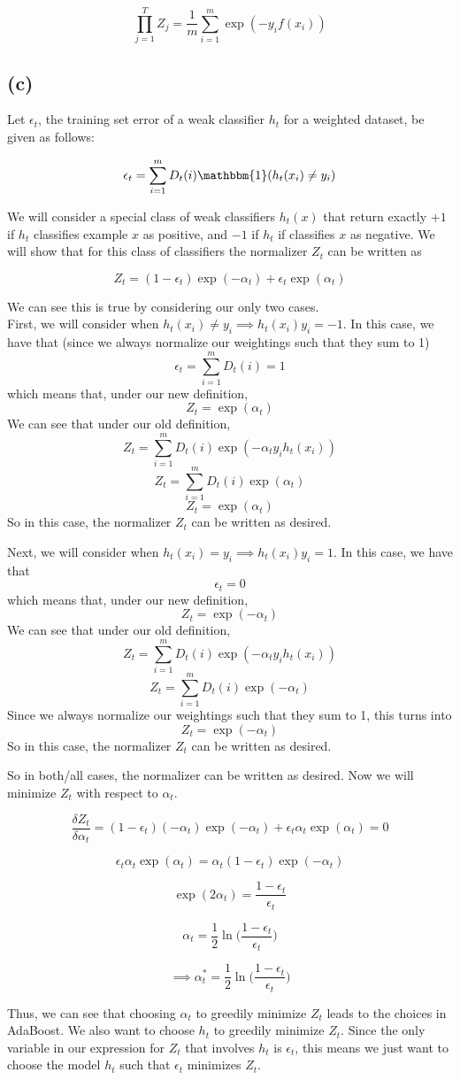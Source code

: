\documentclass{article}
\begin{document}
\[ \prod_{j = 1}^{T} Z_j = \frac{1}{m} \sum_{i = 1}^m \exp(-y_i f(x_i)) \]

\subsection*{(c)}
Let $\epsilon_t$, the training set error of a weak classifier $h_t$ for a weighted
dataset, be given as follows:

\[ \epsilon_t = \sum_{i = 1}^m D_t(i) \mathbbm{1} (h_t(x_i) \neq y_i) \]

We will consider a special class of weak classifiers $h_t(x)$ that return exactly
$+1$ if $h_t$ classifies example $x$ as positive, and $-1$ if $h_t$ if classifies
$x$ as negative. We will show that for this class of classifiers the normalizer
$Z_t$ can be written as

\[ Z_t = (1 - \epsilon_t) \exp(-\alpha_t) + \epsilon_t \exp(\alpha_t) \]

We can see this is true by considering our only two cases. \\
First, we will consider when $h_t(x_i) \neq y_i \implies h_t(x_i) y_i = -1$.
In this case, we have that (since we always normalize our weightings such that
they sum to 1)
\[ \epsilon_t = \sum_{i = 1}^m D_t(i) = 1 \]
which means that, under our new definition,
\[ Z_t = \exp(\alpha_t) \]
We can see that under our old definition,
\[ Z_t = \sum_{i = 1}^m D_t(i) \exp(-\alpha_t y_i h_t(x_i)) \]
\[ Z_t = \sum_{i = 1}^m D_t(i) \exp(\alpha_t) \]
\[ Z_t = \exp(\alpha_t) \]
So in this case, the normalizer $Z_t$ can be written as desired.

Next, we will consider when $h_t(x_i) = y_i \implies h_t(x_i) y_i = 1$.
In this case, we have that
\[ \epsilon_t = 0 \]
which means that, under our new definition,
\[ Z_t = \exp(-\alpha_t) \]
We can see that under our old definition,
\[ Z_t = \sum_{i = 1}^m D_t(i) \exp(-\alpha_t y_i h_t(x_i)) \]
\[ Z_t = \sum_{i = 1}^m D_t(i) \exp(-\alpha_t) \]
Since we always normalize our weightings such that they sum to 1, this turns into
\[ Z_t = \exp(-\alpha_t) \]
So in this case, the normalizer $Z_t$ can be written as desired.

So in both/all cases, the normalizer can be written as desired. Now we will
minimize $Z_t$ with respect to $\alpha_t$.

\[ \frac{\delta Z_t}{\delta \alpha_t} = (1 - \epsilon_t)(-\alpha_t)\exp(-\alpha_t)
    + \epsilon_t \alpha_t \exp(\alpha_t) = 0 \]

\[ \epsilon_t \alpha_t \exp(\alpha_t) = \alpha_t (1 - \epsilon_t) \exp(-\alpha_t) \]

\[ \exp(2 \alpha_t) = \frac{1 - \epsilon_t}{\epsilon_t} \]

\[ \alpha_t = \frac{1}{2} \ln \Big(\frac{1 - \epsilon_t}{\epsilon_t} \Big) \]

\[ \implies \alpha^*_t = \frac{1}{2} \ln \Big(\frac{1 - \epsilon_t}{\epsilon_t} \Big) \]

Thus, we can see that choosing $\alpha_t$ to greedily minimize $Z_t$ leads to
the choices in AdaBoost. We also want to choose $h_t$ to greedily minimize
$Z_t$. Since the only variable in our expression for $Z_t$ that involves
$h_t$ is $\epsilon_t$, this means we just want to choose the model $h_t$ such
that $\epsilon_t$ minimizes $Z_t$.
\end{document}
